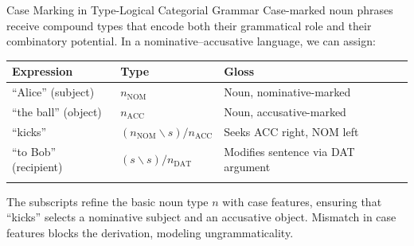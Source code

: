 \documentclass[
  ignorenonframetext,
]{beamer}
\newcounter{none} %
\begin{document}
\begin{frame}{Case Marking in Type-Logical Categorial Grammar}
\protect{}\label{case-marking-in-type-logical-categorial-grammar}
Case-marked noun phrases receive compound types that encode both their
grammatical role and their combinatory potential. In a
nominative--accusative language, we can assign:

{\def\LTcaptype{none} %
\begin{longtable}[]{@{}
  >{\raggedright\arraybackslash}p{}
  >{\raggedright\arraybackslash}p{}
  >{\raggedright\arraybackslash}p{}@{}}
\toprule\noalign{}
\begin{minipage}[b]{\linewidth}\raggedright
Expression
\end{minipage} & \begin{minipage}[b]{\linewidth}\raggedright
Type
\end{minipage} & \begin{minipage}[b]{\linewidth}\raggedright
Gloss
\end{minipage} \\
\midrule\noalign{}
\endhead
``Alice'' (subject) & \(n_{\text{NOM}}\) & Noun, nominative-marked \\
``the ball'' (object) & \(n_{\text{ACC}}\) & Noun, accusative-marked \\
``kicks'' & \((n_{\text{NOM}} \backslash s) / n_{\text{ACC}}\) & Seeks
ACC right, NOM left \\
``to Bob'' (recipient) & \((s \backslash s) / n_{\text{DAT}}\) &
Modifies sentence via DAT argument \\
\bottomrule\noalign{}
\end{longtable}
}

The subscripts refine the basic noun type \(n\) with case features,
ensuring that ``kicks'' selects a nominative subject and an accusative
object. Mismatch in case features blocks the derivation, modeling
ungrammaticality.
\end{frame}
\end{document}
